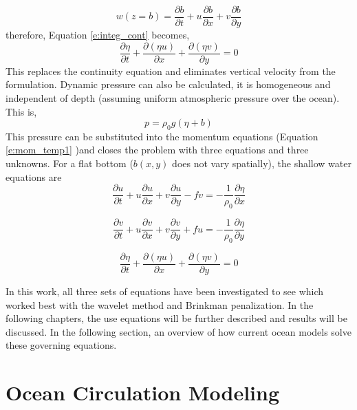 \begin{equation*}
    w(z=b) = \frac{\partial b}{\partial t} + u \frac{\partial b}{\partial x} + v \frac{\partial b}{\partial y}
\end{equation*}
therefore, Equation \ref{e:integ_cont} becomes, 
\begin{equation*}
    \frac{\partial \eta}{\partial t} + \frac{\partial (\eta u)}{\partial x} + \frac{\partial (\eta v)}{\partial y} =0
\end{equation*}
%
This replaces the continuity equation and eliminates vertical velocity from the formulation.  Dynamic pressure can also be calculated, it is homogeneous and independent of depth (assuming uniform atmospheric pressure over the ocean).  This is, 
%
\begin{equation*}
   p=\rho_{0} g (\eta +b)
\end{equation*}
%
This pressure can be substituted into the momentum equations (Equation \ref{e:mom_temp1} )and closes the problem with three equations and three unknowns.  For a flat bottom ($b(x, y)$ does not vary spatially), the shallow water equations are
%
\begin{equation}\label{e:swe_xmom}
    \frac{\partial u}{\partial t} + u \frac{\partial u}{\partial x} + v \frac{\partial u}{\partial y} - fv = - \frac{1}{\rho_0} \frac{\partial \eta}{\partial x} 
\end{equation}

\begin{equation}\label{e:swe_ymom}
    \frac{\partial v}{\partial t} + u \frac{\partial v}{\partial x} + v \frac{\partial v}{\partial y} + fu = - \frac{1}{\rho_0} \frac{\partial \eta}{\partial y}
\end{equation}

\begin{equation}\label{e:swe_cont}
    \frac{\partial \eta}{\partial t} + \frac{\partial (\eta u)}{\partial x} + \frac{\partial (\eta v)}{\partial y}=0
\end{equation}

In this work, all three sets of equations have been investigated to see which worked best with the wavelet method and Brinkman penalization.  In the following chapters, the use equations will be further described and results will be discussed.  In the following section, an overview of how current ocean models solve these governing equations.  

\section{Ocean Circulation Modeling}
\label{sec:BackOceanModeling}

